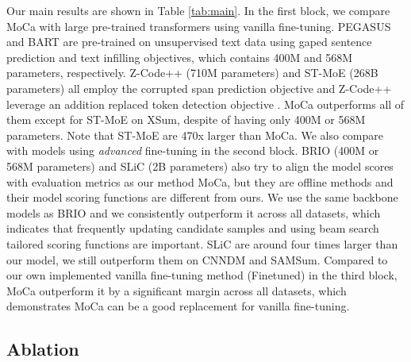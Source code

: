 \documentclass{article}
\begin{document}
Our main results are shown in Table \ref{tab:main}. In the first block, we compare MoCa with large pre-trained transformers using vanilla fine-tuning. PEGASUS \cite{zhang:2019:icml} and BART \cite{lewis-etal-2020-bart} are pre-trained on unsupervised text data using gaped sentence prediction and text infilling objectives, which contains 400M and 568M parameters, respectively. Z-Code++ \cite{he2022z} (710M parameters) and ST-MoE \cite{zoph2202st} (268B parameters) all employ the corrupted span prediction objective \cite{raffel2020exploring} and Z-Code++ leverage an addition replaced token detection objective \cite{clark2020electra}. MoCa outperforms all of them except for ST-MoE on XSum, despite of having only 400M or 568M parameters. Note that ST-MoE are 470x larger than MoCa.
We also compare with models using \emph{advanced} fine-tuning in the second block. BRIO (400M or 568M parameters) \cite{liu-etal-2022-brio} and SLiC (2B parameters) \cite{zhao2022calibrating} also try to align the model scores with evaluation metrics as our method MoCa, but they are offline methods and their model scoring functions are different from ours. We use the same backbone models as BRIO and we consistently outperform it across all datasets, which indicates that frequently updating candidate samples and using beam search tailored scoring functions are important. SLiC are around four times larger than our model, we still outperform them on CNNDM and SAMSum. Compared to our own implemented vanilla fine-tuning method (Finetuned) in the third block, MoCa outperform it by a significant margin across all datasets, which demonstrates MoCa can be a good replacement for vanilla fine-tuning. 

\subsection{Ablation}
\end{document}
